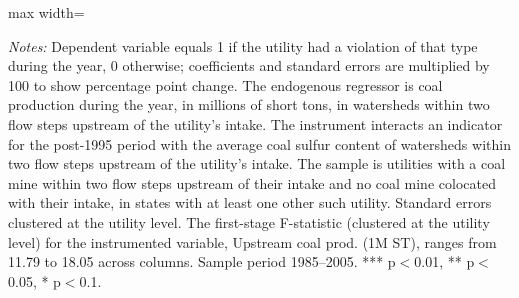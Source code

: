 \begin{table}[htbp]
{\begin{adjustbox}{max width=\linewidth}
\begin{tabular}
\bottomrule
\end{tabular}
\end{adjustbox}
}
\begin{minipage}{\linewidth}
\vspace{4pt}
\footnotesize
\raggedright
\textit{Notes:} Dependent variable equals 1 if the utility had a violation of that type during the year, 0 otherwise; coefficients and standard errors are multiplied by 100 to show percentage point change. The endogenous regressor is coal production during the year, in millions of short tons, in watersheds within two flow steps upstream of the utility's intake. The instrument interacts an indicator for the post-1995 period with the average coal sulfur content of watersheds within two flow steps upstream of the utility's intake. The sample is utilities with a coal mine within two flow steps upstream of their intake and no coal mine colocated with their intake, in states with at least one other such utility. Standard errors clustered at the utility level. The first-stage F-statistic (clustered at the utility level) for the instrumented variable, Upstream coal prod. (1M ST), ranges from 11.79 to 18.05 across columns. Sample period 1985--2005. *** p$<$0.01, ** p$<$0.05, * p$<$0.1.
\end{minipage}
\end{table}
